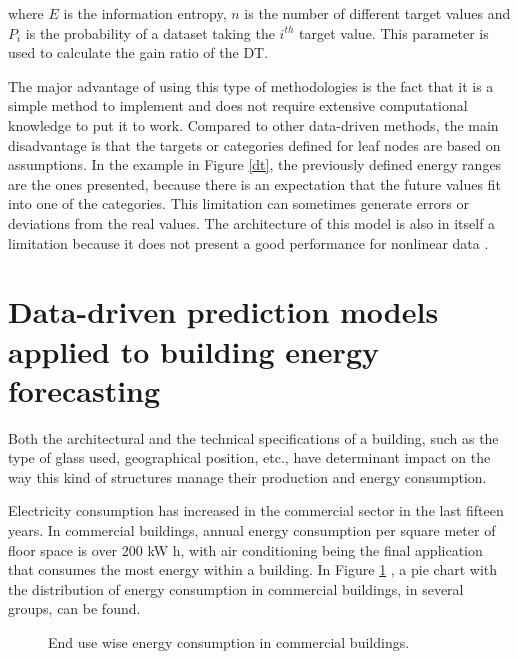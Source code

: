 where $E$ is the information entropy, $n$ is the number of different target values and $P_i$ is the probability of a dataset taking the $i^{th}$ target value. This parameter is used to calculate the gain ratio of the \ac{DT}.

The major advantage of using this type of methodologies is the fact that it is a simple method to implement and does not require extensive computational knowledge to put it to work. Compared to other data-driven methods, the main disadvantage is that the targets or categories defined for leaf nodes are based on assumptions. In the example in Figure \ref{dt}, the previously defined energy ranges are the ones presented, because there is an expectation that the future values fit into one of the categories. This limitation can sometimes generate errors or deviations from the real values. The architecture of this model is also in itself a limitation because it does not present a good performance for nonlinear data \cite{dt2}.


\section{Data-driven prediction models applied to building energy forecasting \label{c}}

Both the architectural and the technical specifications of a building, such as the type of glass used, geographical position, etc., have determinant impact on the way this kind of structures manage their production and energy consumption. 

Electricity consumption has increased in the commercial sector in the last fifteen years.  In commercial buildings, annual energy consumption per square meter of floor space is over 200 kW h, with air conditioning being the final application that consumes the most energy within a building\cite{pie_1}. In Figure \ref{buildingenergy} \cite{pie_1}, a pie chart with the distribution of energy consumption in commercial buildings, in several groups, can be found.


\begin{figure}[h!]
    \centering
    \begin{center}
    \caption{End use wise energy consumption in commercial buildings.}
    \label{buildingenergy}
    \end{center}
\end{figure}


